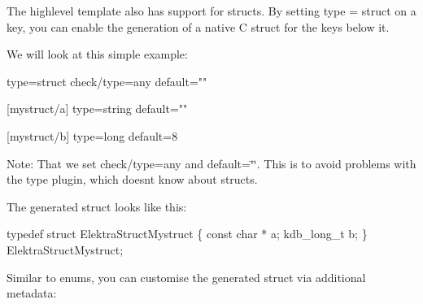 The {\ttfamily highlevel} template also has support for structs. By setting {\ttfamily type = struct} on a key, you can enable the generation of a native C {\ttfamily struct} for the keys below it.

We will look at this simple example\+:


\begin{DoxyCode}
[mystruct]
type=struct
check/type=any
default=""

[mystruct/a]
type=string
default=""

[mystruct/b]
type=long
default=8
\end{DoxyCode}


Note\+: That we set {\ttfamily check/type=any} and {\ttfamily default=\char`\"{}\char`\"{}}. This is to avoid problems with the {\ttfamily type} plugin, which doesn\textquotesingle{}t know about {\ttfamily struct}s.

The generated struct looks like this\+:


\begin{DoxyCode}
\textcolor{keyword}{typedef} \textcolor{keyword}{struct }ElektraStructMystruct
\{
    \textcolor{keyword}{const} \textcolor{keywordtype}{char} * a;
    kdb\_long\_t b;
\} ElektraStructMystruct;
\end{DoxyCode}


Similar to enums, you can customise the generated struct via additional metadata\+:



